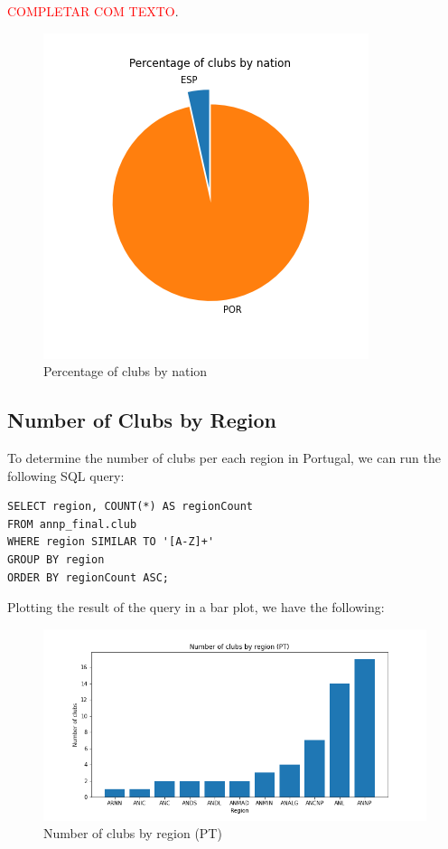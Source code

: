 \textcolor{red}{COMPLETAR COM TEXTO}.

\begin{figure}[H]
    \centering
    \includegraphics[width=.45\textwidth]{img/clubsbynation-pie}
    \caption{Percentage of clubs by nation}
    \label{fig:clubs-by-nation-pie}
\end{figure}

\subsection{Number of Clubs by Region}\label{subsec:number-of-clubs-by-region}

To determine the number of clubs per each region in Portugal, we can run the following SQL query:

\begin{verbatim}
SELECT region, COUNT(*) AS regionCount
FROM annp_final.club
WHERE region SIMILAR TO '[A-Z]+'
GROUP BY region
ORDER BY regionCount ASC;
\end{verbatim}

Plotting the result of the query in a bar plot, we have the following:

\begin{figure}[H]
    \centering
    \includegraphics[width=.85\textwidth]{img/clubsbyregion-pt}
    \caption{Number of clubs by region (PT)}
    \label{fig:clubs-by-region-pt}
\end{figure}

